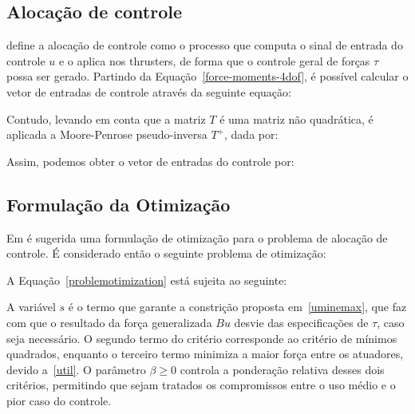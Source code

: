 \documentclass[../main.tex]{subfiles}
\begin{document}
\subsection{Alocação de controle}

\cite{wu20186} define a alocação de controle como o processo que computa o sinal de entrada do controle $u$ e o aplica nos thrusters, de forma que o controle geral de forças $\tau$ possa ser gerado. Partindo da Equação~\ref{force-moments-4dof}, é possível calcular o vetor de entradas de controle através da seguinte equação:
\controlinput

Contudo, levando em conta que a matriz $T$ é uma matriz não quadrática, é aplicada a Moore-Penrose pseudo-inversa $T^{+}$, dada por:
\pseudoinverse

Assim, podemos obter o vetor de entradas do controle por:
\controlinputF

\subsection{Formulação da Otimização}

Em \cite{johansen2005efficient} é sugerida uma formulação de otimização para o problema de alocação de controle. É considerado então o seguinte problema de otimização: 
\problemotimization

A Equação~\ref{problemotimization} está sujeita ao seguinte:
\equesujeita
\uminemax
\util

A variável $s$ é o termo que garante a constrição proposta em~\ref{uminemax}, que faz com que o resultado da força generalizada $Bu$ desvie das especificações de $\tau$, caso seja necessário. O segundo termo do critério corresponde ao critério de mínimos quadrados, enquanto o terceiro termo minimiza a maior força entre os atuadores, devido a~\ref{util}. O parâmetro $\beta\ge0$ controla a ponderação relativa desses dois critérios, permitindo que sejam tratados os compromissos entre o uso médio e o pior caso do controle.
\end{document}
